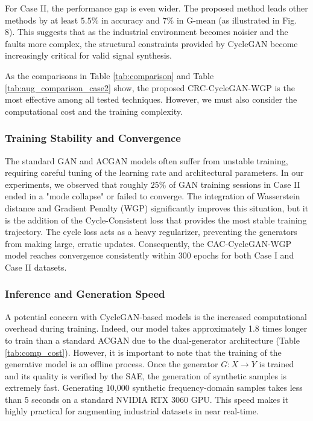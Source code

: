 For Case II, the performance gap is even wider. The proposed method leads other methods by at least $5.5\%$ in accuracy and $7\%$ in G-mean (as illustrated in Fig. 8). This suggests that as the industrial environment becomes noisier and the faults more complex, the structural constraints provided by CycleGAN become increasingly critical for valid signal synthesis.

As the comparisons in Table \ref{tab:comparison} and Table \ref{tab:aug_comparison_case2} show, the proposed CRC-CycleGAN-WGP is the most effective among all tested techniques. However, we must also consider the computational cost and the training complexity.

\subsubsection{Training Stability and Convergence}
The standard GAN and ACGAN models often suffer from unstable training, requiring careful tuning of the learning rate and architectural parameters. In our experiments, we observed that roughly $25\%$ of GAN training sessions in Case II ended in a "mode collapse" or failed to converge. The integration of Wasserstein distance and Gradient Penalty (WGP) significantly improves this situation, but it is the addition of the Cycle-Consistent loss that provides the most stable training trajectory. The cycle loss acts as a heavy regularizer, preventing the generators from making large, erratic updates. Consequently, the CAC-CycleGAN-WGP model reaches convergence consistently within 300 epochs for both Case I and Case II datasets.

\subsubsection{Inference and Generation Speed}
A potential concern with CycleGAN-based models is the increased computational overhead during training. Indeed, our model takes approximately 1.8 times longer to train than a standard ACGAN due to the dual-generator architecture (Table \ref{tab:comp_cost}). However, it is important to note that the training of the generative model is an offline process. Once the generator $G: X \to Y$ is trained and its quality is verified by the SAE, the generation of synthetic samples is extremely fast. Generating 10,000 synthetic frequency-domain samples takes less than 5 seconds on a standard NVIDIA RTX 3060 GPU. This speed makes it highly practical for augmenting industrial datasets in near real-time.

